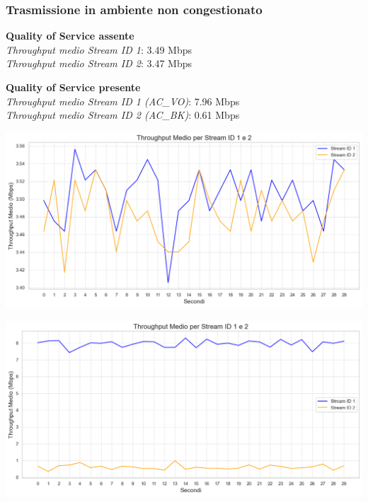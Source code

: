 \documentclass{beamer}
\begin{document}
\begin{frame}
    \frametitle{Trasmissione in ambiente non congestionato}
    
    \begin{minipage}{0.45\textwidth}
        \textbf{Quality of Service assente}\\
        \textit{Throughput medio Stream ID 1}: 3.49 Mbps\\
        \textit{Throughput medio Stream ID 2}: 3.47 Mbps\\
        \vspace{1cm}
        
        \textbf{Quality of Service presente}\\
        \textit{Throughput medio Stream ID 1 (AC\_VO)}: 7.96 Mbps\\
        \textit{Throughput medio Stream ID 2 (AC\_BK)}: 0.61 Mbps\\
    \end{minipage}
    \hfill
    \begin{minipage}{0.5\textwidth}
        \centering
        \begin{minipage}{\textwidth}
            \includegraphics[width=\textwidth]{t1_c0_main.png}
            \vspace{0.5cm}
        \end{minipage}
        \begin{minipage}{\textwidth}
            \includegraphics[width=\textwidth]{t2_c0_main.png}
        \end{minipage}
    \end{minipage}

\end{frame}
\end{document}
